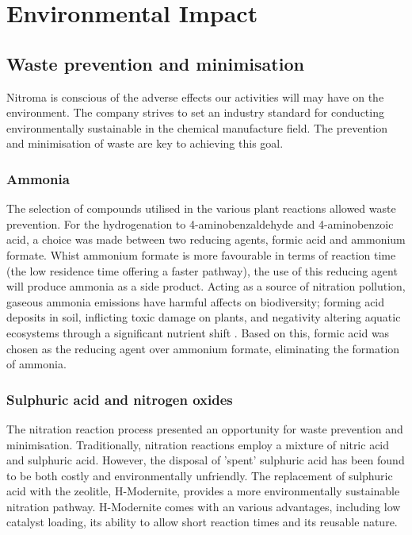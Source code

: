 \section{Environmental Impact}

\subsection{Waste prevention and minimisation}

Nitroma is conscious of the adverse effects our activities will may have on the environment. The company strives to set an industry standard for conducting environmentally sustainable in the chemical manufacture field. The prevention and minimisation of waste are key to achieving this goal. 

\subsubsection{Ammonia}
The selection of compounds utilised in the various plant reactions allowed waste prevention. For the hydrogenation to 4-aminobenzaldehyde and 4-aminobenzoic acid, a choice was made between two reducing agents, formic acid and ammonium formate. Whist ammonium formate is more favourable in terms of reaction time (the low residence time offering a faster pathway), the use of this reducing agent will produce ammonia as a side product. Acting as a  source of nitration pollution, gaseous ammonia emissions have harmful affects on biodiversity; forming acid deposits in soil, inflicting toxic damage on plants, and negativity altering aquatic ecosystems through a significant nutrient shift \cite{european_environment_agency_ammonia_2019}. Based on this, formic acid was chosen as the reducing agent over ammonium formate, eliminating the formation of ammonia. 

\subsubsection{Sulphuric acid and nitrogen oxides}
The nitration reaction process presented an opportunity for waste prevention and minimisation. Traditionally, nitration reactions employ a mixture of nitric acid and sulphuric acid. However, the disposal of 'spent' sulphuric acid has been found to be both costly and environmentally unfriendly. The replacement of sulphuric acid with the zeolitle, H-Modernite, provides a more environmentally sustainable nitration pathway. H-Modernite comes with an various advantages, including low catalyst loading, its ability to allow short reaction times and its reusable nature. 

